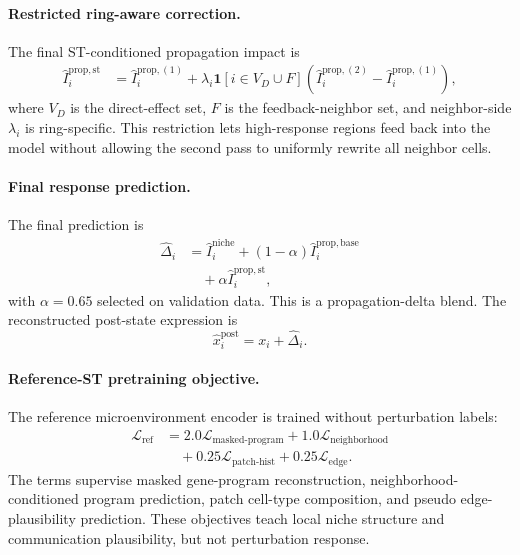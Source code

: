 \documentclass[sigconf,review,balance=false]{acmart}
\begin{document}
\paragraph{Restricted ring-aware correction.}
The final ST-conditioned propagation impact is
\[
\begin{aligned}
\widehat I_i^{\mathrm{prop},\mathrm{st}}
&=
\widehat I_i^{\mathrm{prop},(1)}
+
\lambda_i
\mathbf 1[i\in V_D\cup F]
\left(
\widehat I_i^{\mathrm{prop},(2)}-\widehat I_i^{\mathrm{prop},(1)}
\right),
\end{aligned}
\]
where $V_D$ is the direct-effect set, $F$ is the feedback-neighbor set, and neighbor-side $\lambda_i$ is ring-specific. This restriction lets high-response regions feed back into the model without allowing the second pass to uniformly rewrite all neighbor cells.

\paragraph{Final response prediction.}
The final prediction is
\[
\begin{aligned}
\widehat\Delta_i
&=
\widehat I_i^{\mathrm{niche}}
+
(1-\alpha)\widehat I_i^{\mathrm{prop},\mathrm{base}}
\\
&\quad +
\alpha\widehat I_i^{\mathrm{prop},\mathrm{st}},
\end{aligned}
\]
with $\alpha=0.65$ selected on validation data. This is a propagation-delta blend. The reconstructed post-state expression is
\[
\widehat x_i^{\mathrm{post}}
=
x_i+\widehat\Delta_i.
\]

\paragraph{Reference-ST pretraining objective.}
The reference microenvironment encoder is trained without perturbation labels:
\[
\begin{aligned}
\mathcal L_{\mathrm{ref}}
&=
2.0\mathcal L_{\mathrm{masked\text{-}program}}
+
1.0\mathcal L_{\mathrm{neighborhood}}
\\
&\quad +
0.25\mathcal L_{\mathrm{patch\text{-}hist}}
+
0.25\mathcal L_{\mathrm{edge}}.
\end{aligned}
\]
The terms supervise masked gene-program reconstruction, neighborhood-conditioned program prediction, patch cell-type composition, and pseudo edge-plausibility prediction. These objectives teach local niche structure and communication plausibility, but not perturbation response.
\end{document}
